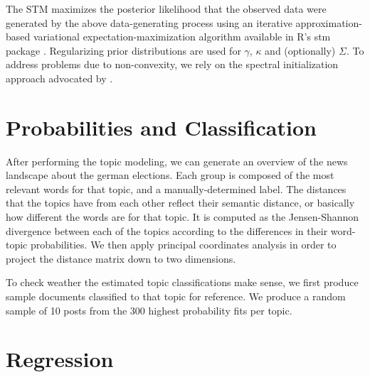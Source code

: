 \documentclass[12pt,a4paper,notitlepage]{article}
\begin{document}
The STM maximizes the posterior likelihood that the observed data were generated by the above data-generating process using an iterative approximation-based variational expectation-maximization algorithm available in R's stm package \citep{roberts_stm:_2016}. Regularizing prior distributions are used for $\gamma$, $\kappa$ and (optionally) $\Sigma$. To address problems due to non-convexity, we rely on the spectral initialization approach advocated by \citet{roberts_navigating_2016}.

\section{Probabilities and Classification}\label{ch_results}

After performing the topic modeling, we can generate an overview of the news landscape about the german elections. Each group is composed of the most relevant words for that topic, and a manually-determined label. The distances that the topics have from each other reflect their semantic distance, or basically how different the words are for that topic. It is computed as the Jensen-Shannon divergence between each of the topics according to the differences in their word-topic probabilities. We then apply principal coordinates analysis in order to project the distance matrix down to two dimensions.


To check weather the estimated topic classifications make sense, we first produce sample documents classified to that topic for reference. We produce a random sample of 10 posts from the 300 highest probability fits per topic.

%

\section{Regression}\label{ch_regression}
\end{document}
